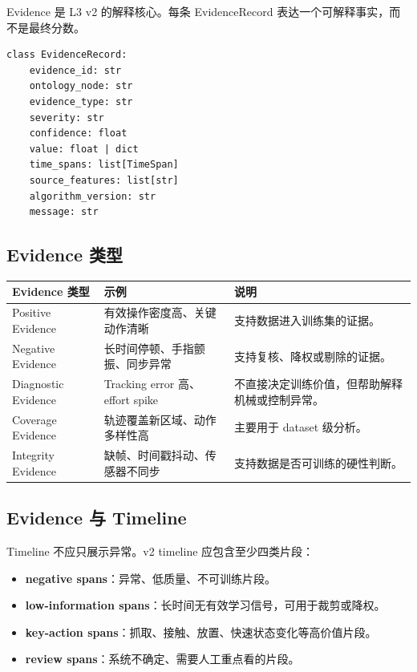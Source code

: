 \documentclass[UTF8,zihao=-4]{ctexart}
\newcommand{\Term}[1]{\textbf{#1}}
\begin{document}
Evidence 是 L3 v2 的解释核心。每条 EvidenceRecord 表达一个可解释事实，而不是最终分数。

\begin{verbatim}
class EvidenceRecord:
    evidence_id: str
    ontology_node: str
    evidence_type: str
    severity: str
    confidence: float
    value: float | dict
    time_spans: list[TimeSpan]
    source_features: list[str]
    algorithm_version: str
    message: str
\end{verbatim}

\subsection{Evidence 类型}

\begin{longtable}{L{3.5cm} L{4cm} L{6.5cm}}
\toprule
Evidence 类型 & 示例 & 说明 \\
\midrule
Positive Evidence & 有效操作密度高、关键动作清晰 & 支持数据进入训练集的证据。 \\
Negative Evidence & 长时间停顿、手指颤振、同步异常 & 支持复核、降权或剔除的证据。 \\
Diagnostic Evidence & Tracking error 高、effort spike & 不直接决定训练价值，但帮助解释机械或控制异常。 \\
Coverage Evidence & 轨迹覆盖新区域、动作多样性高 & 主要用于 dataset 级分析。 \\
Integrity Evidence & 缺帧、时间戳抖动、传感器不同步 & 支持数据是否可训练的硬性判断。 \\
\bottomrule
\end{longtable}

\subsection{Evidence 与 Timeline}

Timeline 不应只展示异常。v2 timeline 应包含至少四类片段：

\begin{itemize}
\item \Term{negative spans}：异常、低质量、不可训练片段。
\item \Term{low-information spans}：长时间无有效学习信号，可用于裁剪或降权。
\item \Term{key-action spans}：抓取、接触、放置、快速状态变化等高价值片段。
\item \Term{review spans}：系统不确定、需要人工重点看的片段。
\end{itemize}
\end{document}
